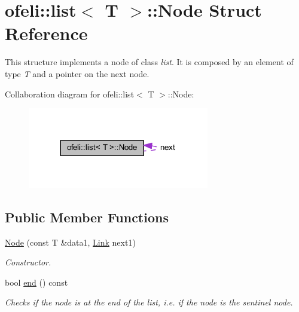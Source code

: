\hypertarget{structofeli_1_1list_1_1_node}{\section{ofeli\-:\-:list$<$ T $>$\-:\-:Node Struct Reference}
\label{structofeli_1_1list_1_1_node}
}


This structure implements a node of class {\itshape list}. It is composed by an element of type {\itshape T} and a pointer on the next node.  




Collaboration diagram for ofeli\-:\-:list$<$ T $>$\-:\-:Node\-:\nopagebreak
\begin{figure}[H]
\begin{center}
\leavevmode
\includegraphics[width=224pt]{structofeli_1_1list_1_1_node__coll__graph}
\end{center}
\end{figure}
\subsection*{Public Member Functions}
\begin{DoxyCompactItemize}
\item 
\hypertarget{structofeli_1_1list_1_1_node_aa51604521fb273117e7008fb2ebd2949}{\hyperlink{structofeli_1_1list_1_1_node_aa51604521fb273117e7008fb2ebd2949}{Node} (const T \&data1, \hyperlink{classofeli_1_1list_a7765ecb875543506d04dbd466f754503}{Link} next1)}\label{structofeli_1_1list_1_1_node_aa51604521fb273117e7008fb2ebd2949}

\begin{DoxyCompactList}\small\item\em Constructor. \end{DoxyCompactList}\item 
\hypertarget{structofeli_1_1list_1_1_node_a0dec619f483d887884d5fcd963e65d9b}{bool \hyperlink{structofeli_1_1list_1_1_node_a0dec619f483d887884d5fcd963e65d9b}{end} () const }\label{structofeli_1_1list_1_1_node_a0dec619f483d887884d5fcd963e65d9b}

\begin{DoxyCompactList}\small\item\em Checks if the node is at the end of the list, i.\-e. if the node is the sentinel node. \end{DoxyCompactList}\end{DoxyCompactItemize}
